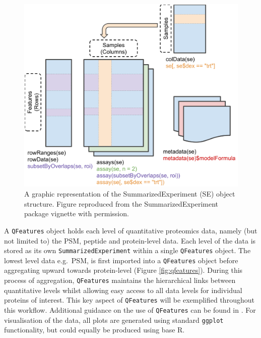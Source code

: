 \documentclass[9pt,a4paper,]{extarticle}
\begin{document}
\begin{figure}

{\centering \includegraphics[width=1\linewidth]{Images/summarized-experiment} 

}

\caption{A graphic representation of the SummarizedExperiment (SE) object structure. Figure reproduced from the SummarizedExperiment package \citep{SumExp} vignette with permission.}\label{fig:summarized-experiment}
\end{figure}

A \texttt{QFeatures} object holds each level of quantitative proteomics data, namely
(but not limited to) the PSM, peptide and protein-level data. Each level of the
data is stored as its own \texttt{SummarizedExperiment} within a single \texttt{QFeatures}
object. The lowest level data e.g.~PSM, is first imported into a \texttt{QFeatures}
object before aggregating upward towards protein-level (Figure
\ref{fig:qfeatures}). During this process of aggregation, \texttt{QFeatures} maintains
the hierarchical links between quantitative levels whilst allowing easy access
to all data levels for individual proteins of interest. This key aspect of
\texttt{QFeatures} will be exemplified throughout this workflow. Additional guidance on
the use of \texttt{QFeatures} can be found in \citep{QFeat}. For visualisation of the data,
all plots are generated using standard \texttt{ggplot} functionality, but could equally
be produced using base R.
\end{document}
